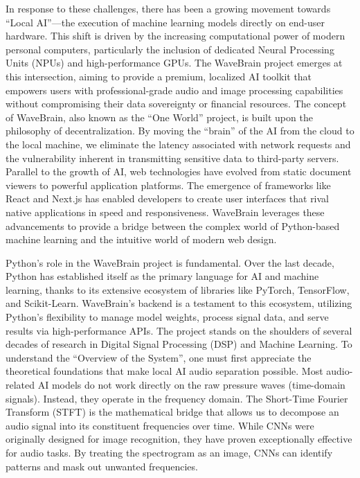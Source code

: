 \documentclass[12pt,a4paper]{article}
\begin{document}
In response to these challenges, there has been a growing movement towards ``Local AI''---the execution of machine learning models directly on end-user hardware. This shift is driven by the increasing computational power of modern personal computers, particularly the inclusion of dedicated Neural Processing Units (NPUs) and high-performance GPUs. The WaveBrain project emerges at this intersection, aiming to provide a premium, localized AI toolkit that empowers users with professional-grade audio and image processing capabilities without compromising their data sovereignty or financial resources. The concept of WaveBrain, also known as the ``One World'' project, is built upon the philosophy of decentralization. By moving the ``brain'' of the AI from the cloud to the local machine, we eliminate the latency associated with network requests and the vulnerability inherent in transmitting sensitive data to third-party servers. Parallel to the growth of AI, web technologies have evolved from static document viewers to powerful application platforms. The emergence of frameworks like React and Next.js has enabled developers to create user interfaces that rival native applications in speed and responsiveness. WaveBrain leverages these advancements to provide a bridge between the complex world of Python-based machine learning and the intuitive world of modern web design.

Python's role in the WaveBrain project is fundamental. Over the last decade, Python has established itself as the primary language for AI and machine learning, thanks to its extensive ecosystem of libraries like PyTorch, TensorFlow, and Scikit-Learn. WaveBrain's backend is a testament to this ecosystem, utilizing Python's flexibility to manage model weights, process signal data, and serve results via high-performance APIs. The project stands on the shoulders of several decades of research in Digital Signal Processing (DSP) and Machine Learning. To understand the ``Overview of the System'', one must first appreciate the theoretical foundations that make local AI audio separation possible. Most audio-related AI models do not work directly on the raw pressure waves (time-domain signals). Instead, they operate in the frequency domain. The Short-Time Fourier Transform (STFT) is the mathematical bridge that allows us to decompose an audio signal into its constituent frequencies over time. While CNNs were originally designed for image recognition, they have proven exceptionally effective for audio tasks. By treating the spectrogram as an image, CNNs can identify patterns and mask out unwanted frequencies.
\end{document}
